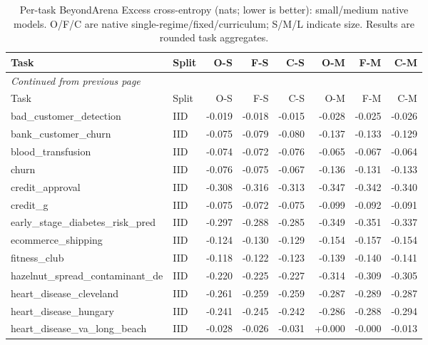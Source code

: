 \begin{longtable}{@{}p{3.95cm}lrrrrrr@{}}
\caption{Per-task BeyondArena Excess cross-entropy (nats; lower is better): small/medium native models. O/F/C are native single-regime/fixed/curriculum; S/M/L indicate size. Results are rounded task aggregates.}\label{tab:cesm}\\
\toprule Task & Split & O-S & F-S & C-S & O-M & F-M & C-M\\\midrule
\endfirsthead
\multicolumn{8}{l}{\emph{Continued from previous page}}\\\toprule
Task & Split & O-S & F-S & C-S & O-M & F-M & C-M\\\midrule\endhead
\bottomrule\endfoot
bad\_\allowbreak{}customer\_\allowbreak{}detection & IID & -0.019 & -0.018 & -0.015 & -0.028 & -0.025 & -0.026\\
bank\_\allowbreak{}customer\_\allowbreak{}churn & IID & -0.075 & -0.079 & -0.080 & -0.137 & -0.133 & -0.129\\
blood\_\allowbreak{}transfusion & IID & -0.074 & -0.072 & -0.076 & -0.065 & -0.067 & -0.064\\
churn & IID & -0.076 & -0.075 & -0.067 & -0.136 & -0.131 & -0.133\\
credit\_\allowbreak{}approval & IID & -0.308 & -0.316 & -0.313 & -0.347 & -0.342 & -0.340\\
credit\_\allowbreak{}g & IID & -0.075 & -0.072 & -0.075 & -0.099 & -0.092 & -0.091\\
early\_\allowbreak{}stage\_\allowbreak{}diabetes\_\allowbreak{}risk\_\allowbreak{}pred & IID & -0.297 & -0.288 & -0.285 & -0.349 & -0.351 & -0.337\\
ecommerce\_\allowbreak{}shipping & IID & -0.124 & -0.130 & -0.129 & -0.154 & -0.157 & -0.154\\
fitness\_\allowbreak{}club & IID & -0.118 & -0.122 & -0.123 & -0.139 & -0.140 & -0.141\\
hazelnut\_\allowbreak{}spread\_\allowbreak{}contaminant\_\allowbreak{}de & IID & -0.220 & -0.225 & -0.227 & -0.314 & -0.309 & -0.305\\
heart\_\allowbreak{}disease\_\allowbreak{}cleveland & IID & -0.261 & -0.259 & -0.259 & -0.287 & -0.289 & -0.287\\
heart\_\allowbreak{}disease\_\allowbreak{}hungary & IID & -0.241 & -0.245 & -0.242 & -0.286 & -0.288 & -0.294\\
heart\_\allowbreak{}disease\_\allowbreak{}va\_\allowbreak{}long\_\allowbreak{}beach & IID & -0.028 & -0.026 & -0.031 & +0.000 & -0.000 & -0.013\\

\end{longtable}
